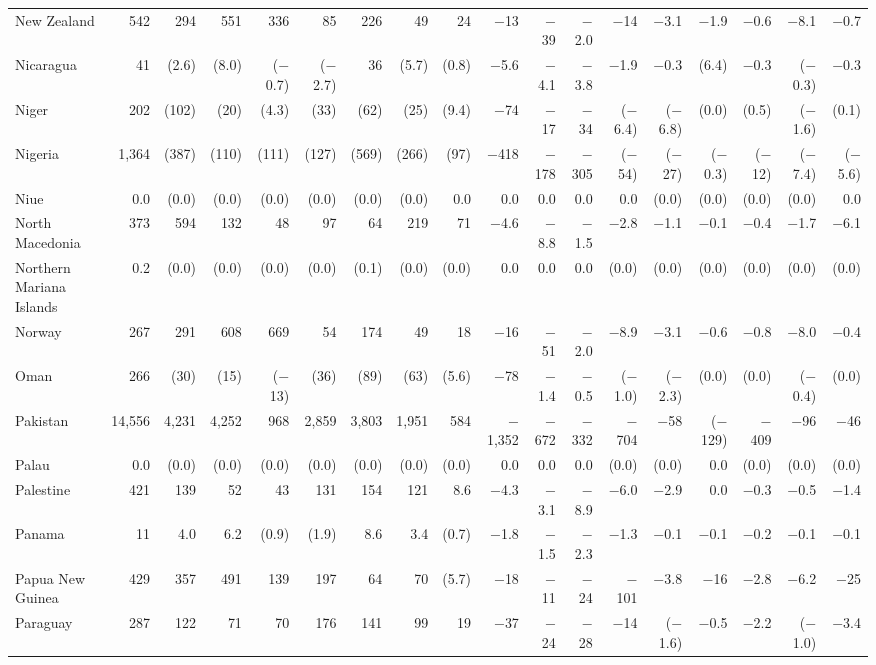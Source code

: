 \begin{longtable}{lrrrrrrrrrrrrrrrrr}
New Zealand & 542 & 294 & 551 & 336 & 85 & 226 & 49 & 24 & $-$13 & $-$39 & $-$2.0 & $-$14 & $-$3.1 & $-$1.9 & $-$0.6 & $-$8.1 & $-$0.7 \\
Nicaragua & 41 & (2.6) & (8.0) & ($-$0.7) & ($-$2.7) & 36 & (5.7) & (0.8) & $-$5.6 & $-$4.1 & $-$3.8 & $-$1.9 & $-$0.3 & (6.4) & $-$0.3 & ($-$0.3) & $-$0.3 \\
Niger & 202 & (102) & (20) & (4.3) & (33) & (62) & (25) & (9.4) & $-$74 & $-$17 & $-$34 & ($-$6.4) & ($-$6.8) & (0.0) & (0.5) & ($-$1.6) & (0.1) \\
Nigeria & 1,364 & (387) & (110) & (111) & (127) & (569) & (266) & (97) & $-$418 & $-$178 & $-$305 & ($-$54) & ($-$27) & ($-$0.3) & ($-$12) & ($-$7.4) & ($-$5.6) \\
Niue & 0.0 & (0.0) & (0.0) & (0.0) & (0.0) & (0.0) & (0.0) & 0.0 & 0.0 & 0.0 & 0.0 & 0.0 & (0.0) & (0.0) & (0.0) & (0.0) & 0.0 \\
North Macedonia & 373 & 594 & 132 & 48 & 97 & 64 & 219 & 71 & $-$4.6 & $-$8.8 & $-$1.5 & $-$2.8 & $-$1.1 & $-$0.1 & $-$0.4 & $-$1.7 & $-$6.1 \\
Northern Mariana Islands & 0.2 & (0.0) & (0.0) & (0.0) & (0.0) & (0.1) & (0.0) & (0.0) & 0.0 & 0.0 & 0.0 & (0.0) & (0.0) & (0.0) & (0.0) & (0.0) & (0.0) \\
Norway & 267 & 291 & 608 & 669 & 54 & 174 & 49 & 18 & $-$16 & $-$51 & $-$2.0 & $-$8.9 & $-$3.1 & $-$0.6 & $-$0.8 & $-$8.0 & $-$0.4 \\
Oman & 266 & (30) & (15) & ($-$13) & (36) & (89) & (63) & (5.6) & $-$78 & $-$1.4 & $-$0.5 & ($-$1.0) & ($-$2.3) & (0.0) & (0.0) & ($-$0.4) & (0.0) \\
Pakistan & 14,556 & 4,231 & 4,252 & 968 & 2,859 & 3,803 & 1,951 & 584 & $-$1,352 & $-$672 & $-$332 & $-$704 & $-$58 & ($-$129) & $-$409 & $-$96 & $-$46 \\
Palau & 0.0 & (0.0) & (0.0) & (0.0) & (0.0) & (0.0) & (0.0) & (0.0) & 0.0 & 0.0 & 0.0 & (0.0) & (0.0) & 0.0 & (0.0) & (0.0) & (0.0) \\
Palestine & 421 & 139 & 52 & 43 & 131 & 154 & 121 & 8.6 & $-$4.3 & $-$3.1 & $-$8.9 & $-$6.0 & $-$2.9 & 0.0 & $-$0.3 & $-$0.5 & $-$1.4 \\
Panama & 11 & 4.0 & 6.2 & (0.9) & (1.9) & 8.6 & 3.4 & (0.7) & $-$1.8 & $-$1.5 & $-$2.3 & $-$1.3 & $-$0.1 & $-$0.1 & $-$0.2 & $-$0.1 & $-$0.1 \\
Papua New Guinea & 429 & 357 & 491 & 139 & 197 & 64 & 70 & (5.7) & $-$18 & $-$11 & $-$24 & $-$101 & $-$3.8 & $-$16 & $-$2.8 & $-$6.2 & $-$25 \\
Paraguay & 287 & 122 & 71 & 70 & 176 & 141 & 99 & 19 & $-$37 & $-$24 & $-$28 & $-$14 & ($-$1.6) & $-$0.5 & $-$2.2 & ($-$1.0) & $-$3.4 \\

\end{longtable}
